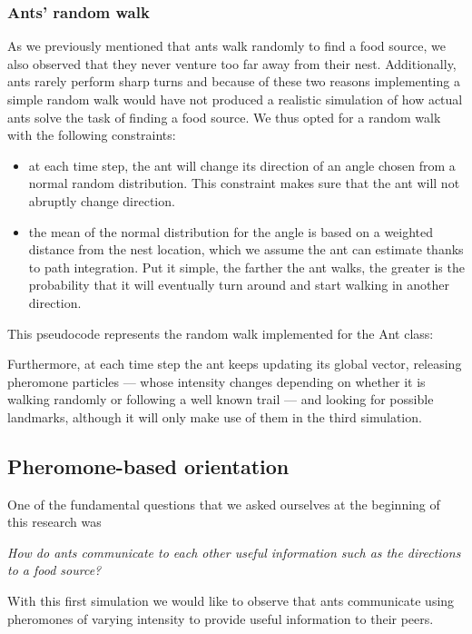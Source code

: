 \documentclass[11pt]{article}
\begin{document}
\subsubsection {Ants' random walk}
As we previously mentioned that ants walk randomly to find a food source, we also observed that they never venture too far away from their nest. Additionally, ants rarely perform sharp turns and because of these two reasons implementing a simple random walk would have not produced a realistic simulation of how actual ants solve the task of finding a food source. We thus opted for a random walk with the following constraints:

\begin{itemize}
\item at each time step, the ant will change its direction of an angle chosen from a normal random distribution. This constraint makes sure that the ant will not abruptly change direction.
\item the mean of the normal distribution for the angle is based on a weighted distance from the nest location, which we assume the ant can estimate thanks to path integration. Put it simple, the farther the ant walks, the greater is the probability that it will eventually turn around and start walking in another direction.
\end{itemize}

This pseudocode represents the random walk implemented for the Ant class:



Furthermore, at each time step the ant keeps updating its global vector, releasing pheromone particles --- whose intensity changes depending on whether it is walking randomly or following a well known trail --- and looking for possible landmarks, although it will only make use of them in the third simulation.

\subsection{Pheromone-based orientation}

One of the fundamental questions that we asked ourselves at the beginning of this research was
\begin{center}
	\emph{How do ants communicate to each other useful information such as the directions to a food source?}
\end{center}
With this first simulation we would like to observe that ants communicate using pheromones of varying intensity to provide useful information to their peers.
\end{document}
